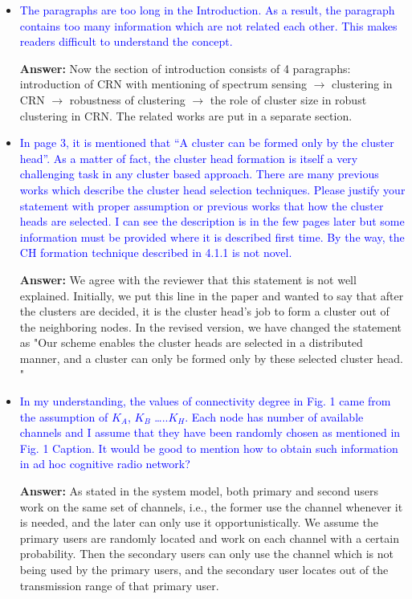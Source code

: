 \documentclass[10pt,a4paper]{article}
\begin{document}
\begin{itemize}
\item \textcolor{blue}{  The paragraphs are too long in the Introduction. As a result, the paragraph contains too many information which are not related each other. This makes readers difficult to understand the concept.}
    
    \textbf{Answer:} Now the section of introduction consists of 4 paragraphs: introduction of CRN with mentioning of spectrum sensing $\rightarrow$ clustering in CRN $\rightarrow$ robustness of clustering $\rightarrow$ the role of cluster size in robust clustering in CRN.
    The related works are put in a separate section.
    
\item \textcolor{blue}{   In page 3, it is mentioned that “A cluster can be formed only by the cluster head”. As a matter of fact, the cluster head formation is itself a very challenging task in any cluster based approach. There are many previous works which describe the cluster head selection techniques. Please justify your statement with proper assumption or previous works that how the cluster heads are selected. I can see the description is in the few pages later but some information must be provided where it is described first time. By the way, the CH formation technique described in 4.1.1 is not novel.}

\textbf{Answer:} We agree with the reviewer that this statement is not well explained.
	    Initially, we put this line in the paper and wanted to say that after the clusters are decided, it is the cluster head's job to form a cluster out of the neighboring nodes.
In the revised version, we have changed the statement as "Our scheme enables the cluster heads are selected in a distributed manner, and a cluster can only be formed only by these selected cluster head. "
    
\item \textcolor{blue}{  In my understanding, the values of connectivity degree in Fig. 1 came from the assumption of $K_A$, $K_B$ …..$K_H$. Each node has number of available channels and I assume that they have been randomly chosen as mentioned in Fig. 1 Caption. It would be good to mention how to obtain such information in ad hoc cognitive radio network?}

\textbf{Answer:} As stated in the system model, both primary and second users work on the same set of channels, i.e., the former use the channel whenever it is needed, and the later can only use it opportunistically.
    We assume the primary users are randomly located and work on each channel with a certain probability.
    Then the secondary users can only use the channel which is not being used by the primary users, and the secondary user locates out of the transmission range of that primary user.
    

\end{itemize}
\end{document}
